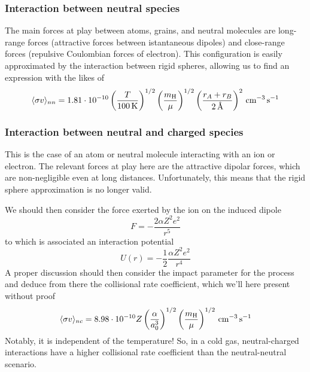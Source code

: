 \subsubsection{Interaction between neutral species}

The main forces at play between atoms, grains, and neutral molecules are long-range forces (attractive forces between istantaneous dipoles) and close-range forces (repulsive Coulombian forces of electron). This configuration is easily approximated by the interaction between rigid spheres, allowing us to find an expression with the likes of 
\begin{equation}
    \langle \sigma v \rangle_{nn} = 1.81\cdot 10^{-10}\left(\frac{T}{100\,\text{K}}\right)^{1/2}\left(\frac{m_{\text{H}}}{\mu}\right)^{1/2}\left(\frac{r_{A}+r_{B}}{2\,\text{Å}}\right)^{2}\,\text{cm}^{-3}\,\text{s}^{-1}
\end{equation} 

\subsubsection{Interaction between neutral and charged species}

This is the case of an atom or neutral molecule interacting with an ion or electron. The relevant forces at play here are the attractive dipolar forces, which are non-negligible even at long distances. Unfortunately, this means that the rigid sphere approximation is no longer valid.
\par We should then consider the force exerted by the ion on the induced dipole
\begin{equation}
    F = - \frac{2\alpha Z^{2}e^{2}}{r^{5}}
\end{equation}
to which is associated an interaction potential 
\begin{equation}
    U(r) = -\frac{1}{2}\frac{\alpha Z^{2}e^{2}}{r^{4}}
\end{equation}
A proper discussion should then consider the impact parameter for the process and deduce from there the collisional rate coefficient, which we'll here present without proof
\begin{equation}
    \langle \sigma v \rangle_{nc} = 8.98\cdot 10^{-10}Z\left(\frac{\alpha}{a_{0}^{3}}\right)^{1/2}\left(\frac{m_{\text{H}}}{\mu}\right)^{1/2}\,\text{cm}^{-3}\,\text{s}^{-1}
\end{equation}
Notably, it is independent of the temperature! So, in a cold gas, neutral-charged interactions have a higher collisional rate coefficient than the neutral-neutral scenario.

